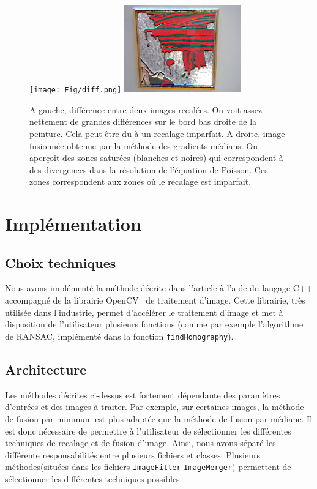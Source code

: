 \documentclass[12pt,a4paper]{article}
\begin{document}
\begin{figure}
\centering
\texttt{[image: Fig/diff.png]}
\includegraphics[width=0.45\textwidth]{Fig/poisson.png}
\caption{A gauche, différence entre deux images recalées. On voit assez nettement de grandes différences sur le bord bas droite de la peinture. Cela peut être du à un recalage imparfait. A droite, image fusionnée obtenue par la méthode des gradients médians. On aperçoit des zones saturées (blanches et noires) qui correspondent à des divergences dans la résolution de l'équation de Poisson. Ces zones correspondent aux zones où le recalage est imparfait.}
\label{poissonfig}
\end{figure}
\section{Implémentation}

\subsection{Choix techniques}
Nous avons implémenté la méthode décrite dans l'article à l'aide du langage C++ accompagné de la librairie OpenCV~\citep{opencv_library} de traitement d'image. Cette librairie, très utilisée dans l'industrie, permet d'accélérer le traitement d'image et met à disposition de l'utilisateur plusieurs fonctions (comme par exemple l'algorithme de RANSAC, implémenté dans la fonction \texttt{findHomography}).

\subsection{Architecture}
Les méthodes décrites ci-dessus est fortement dépendante des paramètres d'entrées et des images à traiter. Par exemple, sur certaines images, la méthode de fusion par minimum est plus adaptée que la méthode de fusion par médiane. Il est donc nécessaire de permettre à l'utilisateur de sélectionner les différentes techniques de recalage et de fusion d'image. Ainsi, nous avons séparé les différente responsabilités entre plusieurs fichiers et classes. Plusieurs méthodes(situées dans les fichiers \texttt{ImageFitter} \texttt{ImageMerger}) permettent de sélectionner les différentes techniques possibles. 
\end{document}
